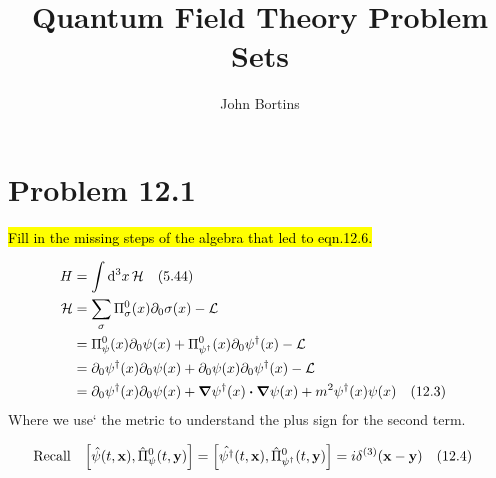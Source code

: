 \documentclass{article}
\title{Quantum Field Theory Problem Sets}
\author{John Bortins}
\begin{document}
\maketitle{}



\section*{Problem 12.1}
\begin{quoting}
    \hl{Fill in the missing steps of the algebra that led to eqn.12.6.}
\end{quoting}

\begin{align*}
    H           & =\int \dd[3]{x}\mathcal{H} \qq{(5.44)}                                                                                       \\
    \mathcal{H} & =\sum_\sigma \Pi^0_\sigma (x)\partial_0 \sigma(x)-\mathcal{L}                                                                \\
                & =\Pi^0_\psi (x)\partial_0 \psi(x)+\Pi^0_{\psi^\dagger} (x)\partial_0 \psi^\dagger(x)-\mathcal{L}                             \\
                & =\partial_0 \psi^\dagger(x)\partial_0 \psi(x)+\partial_0 \psi(x)\partial_0 \psi^\dagger(x)-\mathcal{L}                       \\
                & = \partial_0 \psi^\dagger (x)\partial_0 \psi(x)+\grad\psi^\dagger (x)\vdot\grad\psi(x)+m^2 \psi^\dagger(x)\psi(x)\qq{(12.3)} \\
\end{align*}
Where we use` the metric to understand the plus sign for the second term.

\begin{align*}
    \qq*{Recall}\bqty{\hat{\psi}(t,\vb{x}),\hat{\Pi}^0_{\psi}(t,\vb{y})} & =\bqty{\hat{\psi^\dagger}(t,\vb{x}),\hat{\Pi}^0_{\psi^\dagger}(t,\vb{y})}=i\delta^{(3)}(\vb{x}-\vb{y})\qq{(12.4)} \\
\end{align*}
\end{document}
